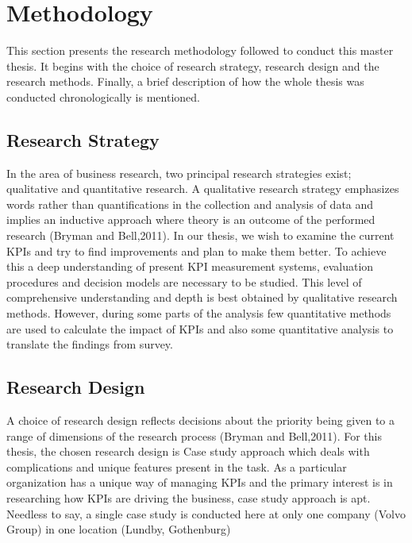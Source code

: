 \chapter{Methodology}

This section presents the research methodology followed to conduct this master thesis. It begins with the choice of research strategy, research design and the research methods. Finally, a brief description of how the whole thesis was conducted chronologically is mentioned.

\section{Research Strategy}
In the area of business research, two principal research strategies exist; qualitative and quantitative research. A qualitative research strategy emphasizes words rather than quantifications in the collection and analysis of data and implies an inductive approach where theory is an outcome of the performed research (Bryman and Bell,2011). In our thesis, we wish to examine the current KPIs and try to find improvements and plan to make them better. To achieve this a deep understanding of present KPI measurement systems, evaluation procedures and decision models are necessary to be studied. This level of comprehensive understanding and depth is best obtained by qualitative research methods. However, during some parts of the analysis few quantitative methods are used to calculate the impact of KPIs and also some quantitative analysis to translate the findings from survey.\\

\section{Research Design}
A choice of research design reflects decisions about the priority being given to a range of dimensions of the research process (Bryman and Bell,2011). For this thesis, the chosen research design is Case study approach which deals with complications and unique features present in the task. As a particular organization has a unique way of managing KPIs and the primary interest is in researching how KPIs are driving the business, case study approach is apt. Needless to say, a single case study is conducted here at only one company (Volvo Group) in one location (Lundby, Gothenburg)\\



